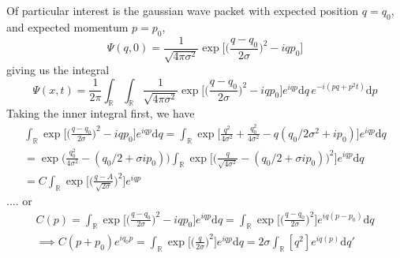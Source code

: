 \documentclass{article}
\begin{document}
    Of particular interest is the gaussian wave packet with expected position $q = q_0$, and expected momentum $p = p_0$,
    \begin{equation}
        \Psi(q, 0) = \frac{1}{\sqrt{4 \pi \sigma^2}} \exp\bigg[ \bigg(\frac{q - q_0}{2 \sigma} \bigg)^2 - i q p_0\bigg]
    \end{equation}
    giving us the integral
    $$
    \Psi(x, t) = \frac{1}{2 \pi} \int_{\mathbb{R}} \int_{\mathbb{R}} \frac{1}{\sqrt{4 \pi \sigma^2}} \exp\bigg[ \bigg(\frac{q - q_0}{2 \sigma} \bigg)^2 - i q p_0\bigg] e^{iqp} \mathrm{d}q \, e^{-i(pq + p^2t)} \mathrm{d}p
    $$
    Taking the inner integral first, we have
    \begin{align*}
    \int_{\mathbb{R}} \exp\bigg[ \bigg(\frac{q - q_0}{2 \sigma} \bigg)^2 - i q p_0\bigg] e^{iqp} \mathrm{d}q = \int_{\mathbb{R}} \exp\bigg[ \frac{q^2}{4 \sigma^2} + \frac{q_0^2}{4 \sigma^2} - q(q_0/2\sigma^2 + i p_0) \bigg] e^{iqp} \mathrm{d}q \\
    = \exp \bigg(\frac{q_0^2}{4 \sigma^2 } - (q_0 / 2 + \sigma ip_0) \bigg)\int_{\mathbb{R}} \exp\bigg[ \bigg( \frac{q}{\sqrt{4 \sigma^2}} - (q_0 / 2 + \sigma ip_0)\bigg)^2 \bigg] e^{iqp} \mathrm{d}q  \\
    = C \int_{\mathbb{R}} \exp\bigg[\bigg( \frac{q - A}{\sqrt{2 \sigma}} \bigg)^2 \bigg] e^{iqp}
    \end{align*}
%
.... or
\begin{align*}
C(p) = \int_{\mathbb{R}} \exp\bigg[ \bigg(\frac{q - q_0}{2 \sigma} \bigg)^2 - i q p_0\bigg] e^{iqp} \mathrm{d}q =  \int_{\mathbb{R}} \exp\bigg[ \bigg(\frac{q - q_0}{2 \sigma} \bigg)^2\bigg] e^{iq(p - p_0)} \mathrm{d}q \\
\implies C(p + p_0) e^{iq_0p} = \int_{\mathbb{R}} \exp\bigg[ \bigg(\frac{q}{2 \sigma} \bigg)^2\bigg] e^{iqp} \mathrm{d}q = 2\sigma \int_{\mathbb{R}} [q^2] e^{iq(p)} \mathrm{d}q' 
\end{align*}
\end{document}
